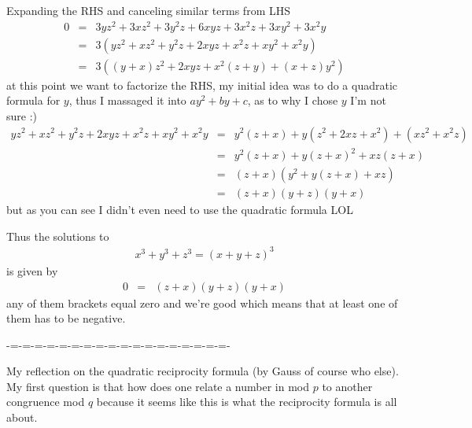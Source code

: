 \documentclass[aps,preprint,preprintnumbers,nofootinbib,showpacs,prd]{revtex4-1}
\newcommand{\nbea}{\begin{eqnarray*}}
\newcommand{\neea}{\end{eqnarray*}}
\begin{document}
Expanding the RHS and canceling similar terms from LHS
%
\nbea
0 & = & 3yz^2 + 3xz^2 + 3y^2z + 6xyz + 3x^2z + 3xy^2 + 3x^2y \\
& = & 3 (yz^2 + xz^2 + y^2z + 2xyz + x^2z + xy^2 + x^2y) \\
& = & 3 ((y+x)z^2 + 2xyz + x^2(z+y) + (x+z)y^2 )
\neea
%
at this point we want to factorize the RHS, my initial idea was to do a quadratic formula for $y$, thus I massaged it into $ay^2 + by + c$, as to why I chose $y$ I'm not sure :)
%
\nbea
yz^2 + xz^2 + y^2z + 2xyz + x^2z + xy^2 + x^2y & = & y^2(z + x) + y(z^2 + 2xz + x^2)  + (xz^2 + x^2z) \\
& = & y^2(z + x) + y(z + x)^2  + xz(z + x) \\
& = & (z + x)(y^2 + y(z + x)  + xz) \\
& = & (z + x)(y + z)(y + x)
\neea
%
but as you can see I didn't even need to use the quadratic formula LOL

Thus the solutions to
%
\nbea
x^3 + y^3 + z^3 = (x + y + z)^3
\neea
%
is given by
%
\nbea
0 & = & (z + x)(y + z)(y + x)
\neea
%
any of them brackets equal zero and we're good which means that at least one of them has to be negative.



-=-=-=-=-=-=-=-=-=-=-=-=-=-=-=-=-=-=-

My reflection on the quadratic reciprocity formula (by Gauss of course who else). My first question is that how does one relate a number in mod $p$ to another congruence mod $q$ because it seems like this is what the reciprocity formula is all about.
\end{document}

